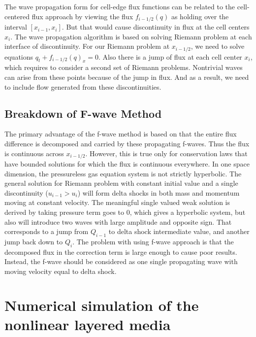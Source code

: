 \documentclass{article}
\begin{document}
	\noindent The wave propagation form for cell-edge flux functions can be related to the cell-centered flux approach by viewing the flux $f_{i-1/2}(q)$ as holding over the interval $[x_{i-1},x_i]$. But that would cause discontinuity in flux at the cell centers $x_i$. The wave propagation algorithm is based on solving Riemann problem at each interface of discontinuity. For our Riemann problem at $x_{i-1/2}$, we need to solve equations $q_t+f_{i-1/2}(q)_x=0$. Also there is a jump of flux at each cell center $x_i$, which requires to consider a second set of Riemann problems. Nontrivial waves can arise from these points because of the jump in flux. And as a result, we need to include flow generated from these discontinuities.
\subsection{Breakdown of F-wave Method}
The primary advantage of the f-wave method is based on that the entire flux difference is decomposed and carried by these propagating f-waves. Thus the flux is continuous across $x_{i-1/2}$. However, this is true only for conservation laws that have bounded solutions for which the flux is continuous everywhere. In one space dimension, the pressureless gas equation system is not strictly hyperbolic. The general solution for Riemann problem with constant initial value and a single discontinuity ($u_{i-1}>u_{i}$) will form delta shocks in both mass and momentum moving at constant velocity. The meaningful single valued weak solution is derived by taking pressure term goes to $0$, which gives a hyperbolic system, but also will introduce two waves with large amplitude and opposite sign. That corresponds to a jump from $Q_{i-1}$ to delta shock intermediate value, and another jump back down to $Q_{i}$. The problem with using f-wave approach is that the decomposed flux in the correction term is large enough to cause poor results. Instead, the f-wave should be considered as one single propagating wave with moving velocity equal to delta shock.
	
\section{Numerical simulation of the nonlinear layered media}
\end{document}
